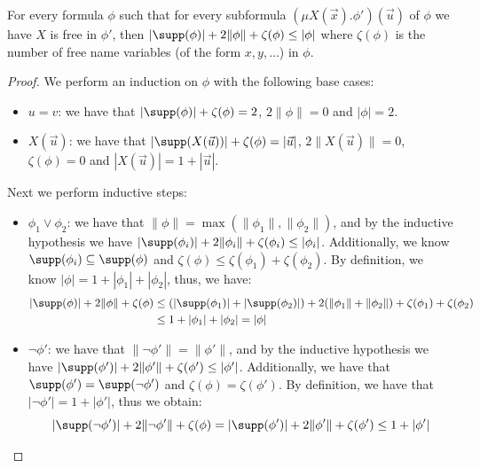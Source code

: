 \begin{lemma}\label{lem:sizebound}
	For every formula $\phi$ such that for every subformula $(\mu X(\vec x).\phi')(\vec u)$ of $\phi$ we have $X$ is free in $\phi'$, then $|\supp(\phi)|+2\|\phi\|+\zeta(\phi)\leq|\phi|$ where $\zeta(\phi)$ is the number of free name variables (of the form $x, y, \dots$) in $\phi$.
\end{lemma}
\begin{proof}
	We perform an induction on $\phi$ with the following base cases:
	\begin{itemize}
		\item $u=v$: we have that $|\supp(\phi)| + \zeta(\phi) = 2$, $2\|\phi\| = 0$  and $|\phi| = 2$. 
		\item $X(\vec u)$: we have that $|\supp(X(\vec u))| + \zeta(\phi) = |\vec u|$, $2\|X(\vec u)\| = 0$, $\zeta(\phi)=0$ and $|X(\vec u)| = 1 + |\vec u|$.
	\end{itemize}
	Next we perform inductive steps:
	\begin{itemize}
		\item $\phi_1 \lor \phi_2$: 
		we have that 
		$\|\phi\| = \max(\|\phi_1\|, \|\phi_2\|)$,
		and by the inductive hypothesis we have $|\supp(\phi_i)| + 2\|\phi_i\| + \zeta(\phi_i) \le |\phi_i|$.
		Additionally, we know $\supp(\phi_i) \subseteq \supp(\phi)$ and $\zeta(\phi) \le \zeta(\phi_1) + \zeta(\phi_2)$. 
		By definition, we know $|\phi| = 1 + |\phi_1| + |\phi_2|$, 
		thus, we have:
		\begin{align*}
			|\supp(\phi)| + 2\|\phi\| + \zeta(\phi)&\le (|\supp(\phi_1)| + |\supp(\phi_2)|) + 2(\|\phi_1\| + \|\phi_2\|) + \zeta(\phi_1) + \zeta(\phi_2) 
			\\&\le 1 + |\phi_1| + |\phi_2| = |\phi|
		\end{align*}
		\item $\lnot \phi'$: we have that $\|\lnot \phi'\| = \|\phi'\|$, and by the inductive hypothesis we have $|\supp(\phi')| + 2\|\phi'\| + \zeta(\phi') \le |\phi'|$. 
		Additionally, we have that $\supp(\phi') = \supp(\lnot \phi')$ and $\zeta(\phi) = \zeta(\phi')$.
		By definition, we have that $|\lnot \phi'| = 1 + |\phi'|$, thus we obtain:
		\[
		|\supp(\lnot \phi')| + 2\|\lnot \phi'\| + \zeta(\phi)= |\supp(\phi')| + 2\|\phi'\| + \zeta(\phi')\le 1 + |\phi'|
\]
\end{itemize}
\end{proof}
